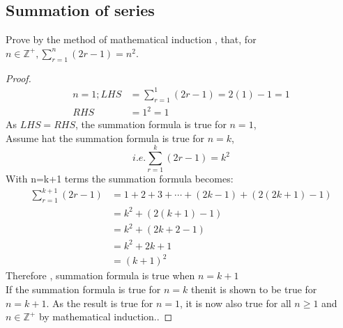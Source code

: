 \documentclass[a4paper]{article}
\begin{document}
\subsection{Summation of series}
\begin{eg}
Prove by the method of mathematical induction , that, for $n\in\mathbb{Z}^+ , \sum_{r=1}^n(2r-1)=n^2$.
\begin{proof}
\begin{align*}
n=1;LHS&=\sum_{r=1}^1(2r-1)=2(1)-1=1\\
RHS&=1^2=1
\end{align*}
As $LHS=RHS$, the summation formula is true for $n=1$,\\

Assume hat the summation formula is true for $n=k$,
\begin{equation*}
i.e. \sum_{r=1}^k(2r-1)=k^2
\end{equation*}
With n=k+1 terms the summation formula becomes:
\begin{align*}
\sum_{r=1}^{k+1}(2r-1)&=1+2+3+\cdots+(2k-1)+(2(2k+1)-1)\\
&=k^2+(2(k+1)-1)\\
&=k^2+(2k+2-1)\\
&=k^2+2k+1\\
&=(k+1)^2
\end{align*}
Therefore , summation formula is true when $n=k+1$\\
If the summation formula is true for $n=k$ thenit is shown to be true for $n=k+1$. As the result is true for $n=1$, it is now also true for all $n\geq1$ and $n\in\mathbb{Z}^+$ by mathematical induction..
\end{proof}
\end{eg}
\end{document}
